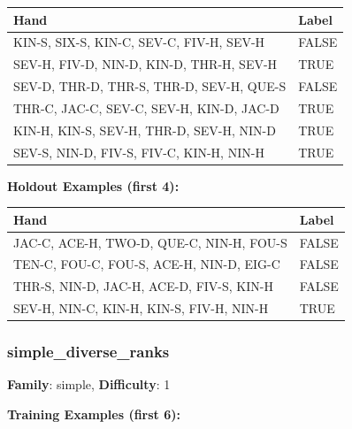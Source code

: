 \documentclass[10pt,a4paper]{article}
\begin{document}
\begin{small}
\begin{tabular}{p{8cm}l}
\toprule
Hand & Label \\
\midrule
KIN-S, SIX-S, KIN-C, SEV-C, FIV-H, SEV-H & \textcolor{negative}{FALSE} \\
SEV-H, FIV-D, NIN-D, KIN-D, THR-H, SEV-H & \textcolor{positive}{TRUE} \\
SEV-D, THR-D, THR-S, THR-D, SEV-H, QUE-S & \textcolor{negative}{FALSE} \\
THR-C, JAC-C, SEV-C, SEV-H, KIN-D, JAC-D & \textcolor{positive}{TRUE} \\
KIN-H, KIN-S, SEV-H, THR-D, SEV-H, NIN-D & \textcolor{positive}{TRUE} \\
SEV-S, NIN-D, FIV-S, FIV-C, KIN-H, NIN-H & \textcolor{positive}{TRUE} \\
\bottomrule
\end{tabular}
\end{small}

\textbf{Holdout Examples (first 4):}

\begin{small}
\begin{tabular}{p{8cm}l}
\toprule
Hand & Label \\
\midrule
JAC-C, ACE-H, TWO-D, QUE-C, NIN-H, FOU-S & \textcolor{negative}{FALSE} \\
TEN-C, FOU-C, FOU-S, ACE-H, NIN-D, EIG-C & \textcolor{negative}{FALSE} \\
THR-S, NIN-D, JAC-H, ACE-D, FIV-S, KIN-H & \textcolor{negative}{FALSE} \\
SEV-H, NIN-C, KIN-H, KIN-S, FIV-H, NIN-H & \textcolor{positive}{TRUE} \\
\bottomrule
\end{tabular}
\end{small}

\vspace{0.5cm}

\subsubsection{simple\_diverse\_ranks}

\textbf{Family}: simple, \textbf{Difficulty}: 1

\textbf{Training Examples (first 6):}
\end{document}
